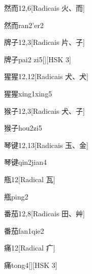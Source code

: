 \begin{entry}{然而}{12,6}[Radicais ⽕、⽽]
  \begin{phonetics}{然而}{ran2'er2}
  \end{phonetics}
\end{entry}

\begin{entry}{牌子}{12,3}[Radicais ⽚、⼦]
  \begin{phonetics}{牌子}{pai2 zi5}[][HSK 3]
  \end{phonetics}
\end{entry}

\begin{entry}{猩猩}{12,12}[Radicais ⽝、⽝]
  \begin{phonetics}{猩猩}{xing1xing5}
  \end{phonetics}
\end{entry}

\begin{entry}{猴子}{12,3}[Radicais ⽝、⼦]
  \begin{phonetics}{猴子}{hou2zi5}
  \end{phonetics}
\end{entry}

\begin{entry}{琴键}{12,13}[Radicais ⽟、⾦]
  \begin{phonetics}{琴键}{qin2jian4}
  \end{phonetics}
\end{entry}

\begin{entry}{甁}{12}[Radical ⽡]
  \begin{phonetics}{甁}{ping2}
  \end{phonetics}
\end{entry}

\begin{entry}{番茄}{12,8}[Radicais ⽥、⾋]
  \begin{phonetics}{番茄}{fan1qie2}
  \end{phonetics}
\end{entry}

\begin{entry}{痛}{12}[Radical ⽧]
  \begin{phonetics}{痛}{tong4}[][HSK 3]
  \end{phonetics}
\end{entry}

